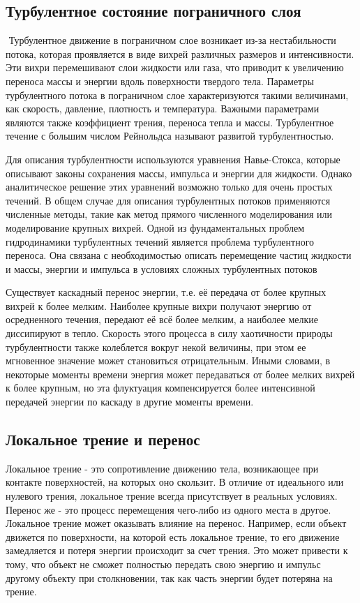 \documentclass[a4paper]{article}
\begin{document}
	\subsection{Турбулентное состояние пограничного слоя}
	‍
		Турбулентное движение в пограничном слое возникает из-за нестабильности потока, которая проявляется в виде вихрей различных размеров и интенсивности. Эти вихри перемешивают слои жидкости или газа, что приводит к увеличению переноса массы и энергии вдоль поверхности твердого тела. Параметры турбулентного потока в пограничном слое характеризуются такими величинами, как скорость, давление, плотность и температура. Важными параметрами являются также коэффициент трения, переноса тепла и массы. Турбулентное течение с большим числом Рейнольдса называют развитой турбулентностью.
		
		Для описания турбулентности используются уравнения Навье-Стокса, которые описывают законы сохранения массы, импульса и энергии для жидкости. Однако аналитическое решение этих уравнений возможно только для очень простых течений. В общем случае для описания турбулентных потоков применяются численные методы, такие как метод прямого численного моделирования или моделирование крупных вихрей. Одной из фундаментальных проблем гидродинамики турбулентных течений является проблема турбулентного переноса. Она связана с необходимостью описать перемещение частиц жидкости и массы, энергии и импульса в условиях сложных турбулентных потоков
		
		Существует каскадный перенос энергии, т.е. её передача от более крупных вихрей к более мелким. Наиболее крупные вихри получают энергию от осредненного течения, передают её всё более мелким, а наиболее мелкие диссипируют в тепло. Скорость этого процесса в силу хаотичности природы турбулентности также колеблется вокруг некой величины, при этом ее мгновенное значение может становиться отрицательным. Иными словами, в некоторые моменты времени энергия может передаваться от более мелких вихрей к более крупным, но эта флуктуация компенсируется более интенсивной передачей энергии по каскаду в другие моменты времени.
		
	\subsection{Локальное трение и перенос}
		Локальное трение - это сопротивление движению тела, возникающее при контакте поверхностей, на которых оно скользит. В отличие от идеального или нулевого трения, локальное трение всегда присутствует в реальных условиях. Перенос же - это процесс перемещения чего-либо из одного места в другое. Локальное трение может оказывать влияние на перенос. Например, если объект движется по поверхности, на которой есть локальное трение, то его движение замедляется и потеря энергии происходит за счет трения. Это может привести к тому, что объект не сможет полностью передать свою энергию и импульс другому объекту при столкновении, так как часть энергии будет потеряна на трение.
		
\end{document}
